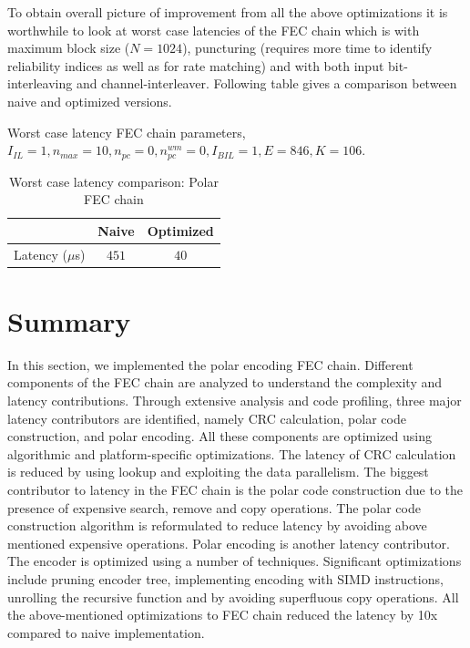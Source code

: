 To obtain overall picture of improvement from all the above optimizations it is worthwhile to look at worst case latencies of the FEC chain which is with maximum block size ($N = 1024$), puncturing (requires more time to identify reliability indices as well as for rate matching) and with both input bit-interleaving and channel-interleaver. Following table gives a comparison between naive and optimized versions.

Worst case latency FEC chain parameters, \newline
$I_{IL} = 1, n_{max} = 10, n_{pc} = 0 ,n_{pc}^{wm} = 0, I_{BIL} = 1, E = 846, K = 106$.
\begin{table}[!h]
	\begin{center}
		\caption{Worst case latency comparison: Polar FEC chain}
		\label{tab:worstFecChain}
		\begin{tabular}{c|c|c} %
			\textbf{ } & Naive & Optimized \\
			\hline
			Latency ($\mu$s) & $451$ & $40$\\
		\end{tabular}
	\end{center}
\end{table}

\section{Summary}
In this section, we implemented the polar encoding FEC chain. Different components of the FEC chain are analyzed to understand the complexity and latency contributions. Through extensive analysis and code profiling, three major latency contributors are identified, namely CRC calculation, polar code construction, and polar encoding. All these components are optimized using algorithmic and platform-specific optimizations. The latency of CRC calculation is reduced by using lookup and exploiting the data parallelism. The biggest contributor to latency in the FEC chain is the polar code construction due to the presence of expensive search, remove and copy operations. The polar code construction algorithm is reformulated to reduce latency by avoiding above mentioned expensive operations. Polar encoding is another latency contributor. The encoder is optimized using a number of techniques. Significant optimizations include pruning encoder tree, implementing encoding with SIMD instructions, unrolling the recursive function and by avoiding superfluous copy operations. All the above-mentioned optimizations to FEC chain reduced the latency by 10x compared to naive implementation.